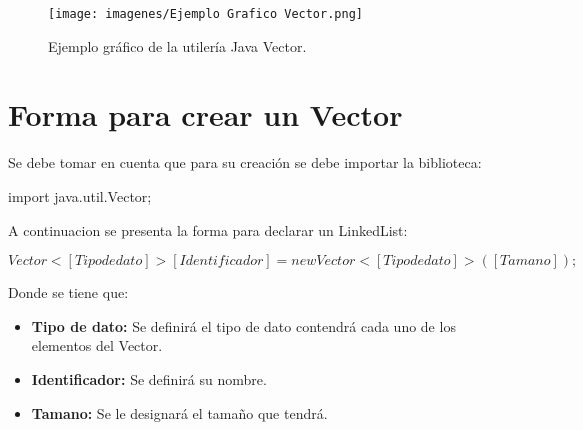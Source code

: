 \documentclass[12pt, letterpaper]{article} %
\begin{document}
\begin{figure}[h]
    \centering
    \texttt{[image: imagenes/Ejemplo Grafico Vector.png]}
    \caption{Ejemplo gráfico de la utilería Java Vector.}
    \label{fig:vector}
\end{figure}

\section*{Forma para crear un Vector}
Se debe tomar en cuenta que para su creación se debe importar la biblioteca:
\begin{center}
    import java.util.Vector;
\end{center}
A continuacion se presenta la forma para declarar un LinkedList:
\begin{center}
    $Vector<[Tipo de dato]> [Identificador] = new Vector<[Tipo de dato]>([Tamano]);$
\end{center}

Donde se tiene que:
\begin{itemize}
    \item \textbf{Tipo de dato:} Se definirá el tipo de dato contendrá cada uno de los elementos del Vector.
    \item \textbf{Identificador:} Se definirá su nombre.
    \item \textbf{Tamano:} Se le designará el tamaño que tendrá.
\end{itemize}
\end{document}
